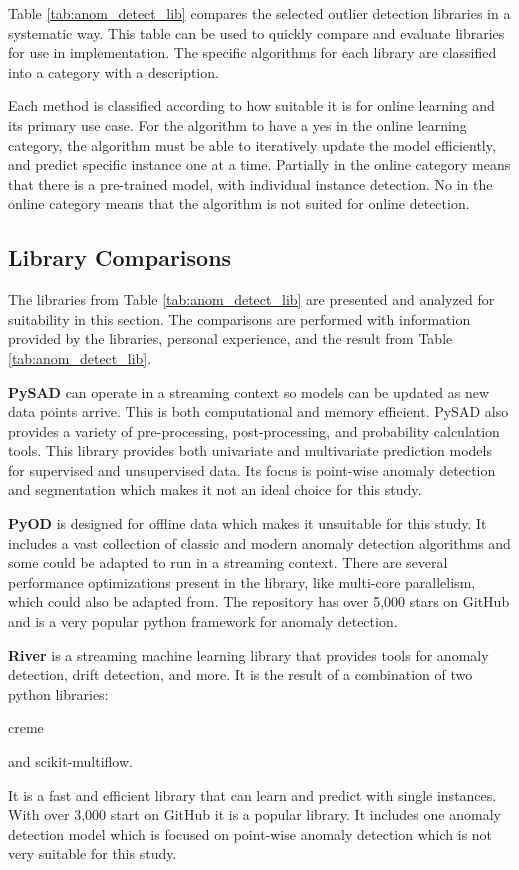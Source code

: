 Table \ref{tab:anom_detect_lib} compares the selected outlier detection libraries in a systematic way. This table can be used to quickly compare and evaluate libraries for use in implementation. The specific algorithms for each library are classified into a category with a description.

Each method is classified according to how suitable it is for online learning and its primary use case. For the algorithm to have a yes in the online learning category, the algorithm must be able to iteratively update the model efficiently, and predict specific instance one at a time. Partially in the online category means that there is a pre-trained model, with individual instance detection. No in the online category means that the algorithm is not suited for online detection.




\subsection{Library Comparisons}

The libraries from Table \ref{tab:anom_detect_lib} are presented and analyzed for suitability in this section. The comparisons are performed with information provided by the libraries, personal experience, and the result from Table \ref{tab:anom_detect_lib}.

\textbf{PySAD} \parencite{pysad} can operate in a streaming context so models can be updated as new data points arrive. This is both computational and memory efficient. PySAD also provides a variety of pre-processing, post-processing, and probability calculation tools. This library provides both univariate and multivariate prediction models for supervised and unsupervised data. Its focus is point-wise anomaly detection and segmentation which makes it not an ideal choice for this study.


\textbf{PyOD} \parencite{zhao2019pyod} is designed for offline data which makes it unsuitable for this study. It includes a vast collection of classic and modern anomaly detection algorithms and some could be adapted to run in a streaming context. There are several performance optimizations present in the library, like multi-core parallelism, which could also be adapted from. The repository has over 5,000 stars on GitHub and is a very popular python framework for anomaly detection.

\textbf{River} \parencite{2020river} is a streaming machine learning library that provides tools for anomaly detection, drift detection, and more. It is the result of a combination of two python libraries:
\begin{inlinelist}
    \item creme
    \item and scikit-multiflow.
\end{inlinelist} It is a fast and efficient library that can learn and predict with single instances. With over 3,000 start on GitHub it is a popular library. It includes one anomaly detection model which is focused on point-wise anomaly detection which is not very suitable for this study.

